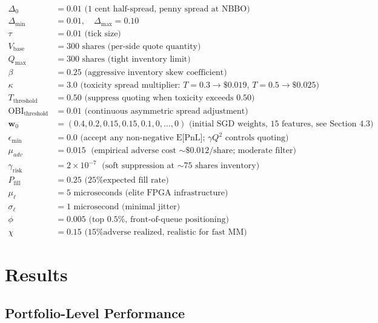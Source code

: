 \documentclass[11pt]{article}
\theoremstyle{definition}
\begin{document}
\begin{align}
\Delta_0 &= 0.01 \text{ (1 cent half-spread, penny spread at NBBO)} \\
\Delta_{\min} &= 0.01, \quad \Delta_{\max} = 0.10 \\
\tau &= 0.01 \text{ (tick size)} \\
V_{\text{base}} &= 300 \text{ shares (per-side quote quantity)} \\
Q_{\max} &= 300 \text{ shares (tight inventory limit)} \\
\beta &= 0.25 \text{ (aggressive inventory skew coefficient)} \\
\kappa &= 3.0 \text{ (toxicity spread multiplier: $T=0.3 \rightarrow \$0.019$, $T=0.5 \rightarrow \$0.025$)} \\
T_{\text{threshold}} &= 0.50 \text{ (suppress quoting when toxicity exceeds 0.50)} \\
\text{OBI}_{\text{threshold}} &= 0.01 \text{ (continuous asymmetric spread adjustment)} \\
\mathbf{w}_0 &= (0.4, 0.2, 0.15, 0.15, 0.1, 0, \ldots, 0) \text{ (initial SGD weights, 15 features, see Section~4.3)} \\
\epsilon_{\min} &= 0.0 \text{ (accept any non-negative E[PnL]; $\gamma Q^2$ controls quoting)} \\
\mu_{adv} &= 0.015 \text{ (empirical adverse cost $\sim$\$0.012/share; moderate filter)} \\
\gamma_{\text{risk}} &= 2 \times 10^{-7} \text{ (soft suppression at $\sim$75 shares inventory)} \\
P_{\text{fill}} &= 0.25 \text{ (25\% expected fill rate)} \\
\mu_\ell &= 5 \text{ microseconds (elite FPGA infrastructure)} \\
\sigma_\ell &= 1 \text{ microsecond (minimal jitter)} \\
\phi &= 0.005 \text{ (top 0.5\%, front-of-queue positioning)} \\
\chi &= 0.15 \text{ (15\% adverse realized, realistic for fast MM)}
\end{align}

\section{Results}

\subsection{Portfolio-Level Performance}
\end{document}
